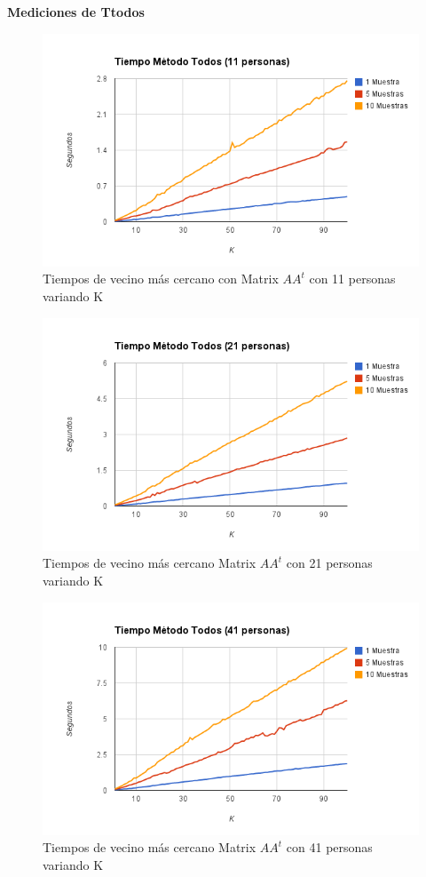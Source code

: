 \textbf{Mediciones de Ttodos }

\begin{figure}[H] \includegraphics[width=1\textwidth]{img/imagef4.png} \caption{Tiempos de vecino
    más cercano con Matrix $AA^t$ con 11 personas variando K} \end{figure}

\begin{figure}[H] \includegraphics[width=1\textwidth]{img/imagef5.png} \caption{Tiempos de vecino
    más cercano Matrix $AA^t$ con 21 personas variando K} \end{figure}

\begin{figure}[H] \includegraphics[width=1\textwidth]{img/imagef6.png} \caption{Tiempos de vecino
    más cercano Matrix $AA^t$ con 41 personas variando K} \end{figure}


